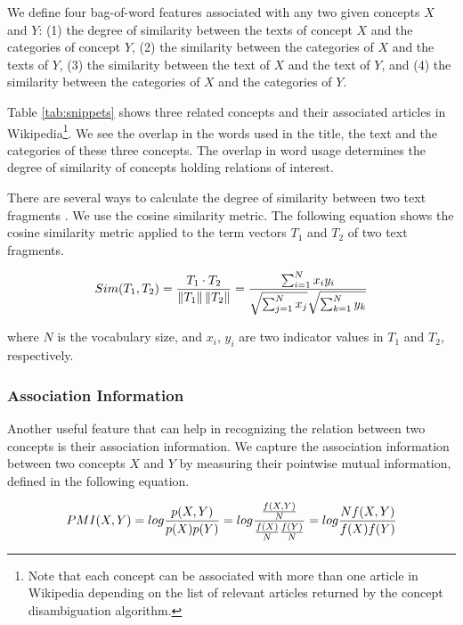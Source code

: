 We define four bag-of-word features associated with any two given
concepts $X$ and $Y$: (1) the degree of similarity between the texts
of concept $X$ and the categories of concept $Y$, (2) the similarity
between the categories of $X$ and the texts of $Y$, (3) the similarity
between the text of $X$ and the text of $Y$, and (4) the similarity
between the categories of $X$ and the categories of $Y$.

Table \ref{tab:snippets} shows three related concepts and their
associated articles in Wikipedia\footnote{Note that each concept can
  be associated with more than one article in Wikipedia depending on
  the list of relevant articles returned by the concept disambiguation
  algorithm.}. We see the overlap in the words used in the title, the
text and the categories of these three concepts. The overlap in word
usage determines the degree of similarity of concepts holding
relations of interest.

There are several ways to calculate the degree of similarity between
two text fragments \cite{mohler-mihalcea:2009:EACL}. We use the cosine
similarity metric. The following equation shows the cosine similarity
metric applied to the term vectors $T_1$ and $T_2$ of two text
fragments.

\begin{equation}
\label{eq:1}
     Sim(T_1, T_2) = \frac{T_1 \cdot T_2}{\left\| T_1 \right\| \left\| T_2 \right\|} = \frac{\sum_{i=1}^{N}x_iy_i}{\sqrt{\sum_{j=1}^{N}x_j} \sqrt{\sum_{k=1}^{N}y_k}}  \notag
\end{equation}


where $N$ is the vocabulary size, and $x_i$, $y_i$ are two indicator
values in $T_1$ and $T_2$, respectively.

\subsubsection{Association Information}
Another useful feature that can help in recognizing the relation
between two concepts is their association information. We capture the
association information between two concepts $X$ and $Y$ by measuring
their pointwise mutual information, defined in the following equation.

\begin{equation}
\label{eq:2}
  PMI(X, Y) = log \frac{p(X, Y)}{p(X)p(Y)} = log \frac{\frac{f(X,Y)}{N}}{\frac{f(X)}{N} \frac{f(Y)}{N}} = log\frac{N f(X,Y)}{f(X)f(Y)} \notag
\end{equation}

